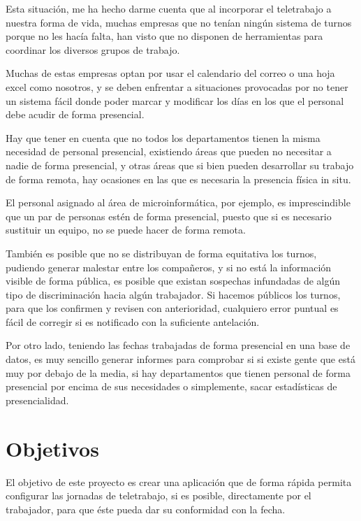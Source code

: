 \documentclass[11pt,spanish,listoffigures,listoftables]{tfgetsinf}
\begin{document}
Esta situación, me ha hecho darme cuenta que al incorporar el teletrabajo a nuestra forma de vida, muchas empresas que no tenían ningún sistema de turnos porque no les hacía falta, han visto que no disponen de herramientas para coordinar los diversos grupos de trabajo.

Muchas de estas empresas optan por usar el calendario del correo o una hoja excel como nosotros, y se deben enfrentar a situaciones provocadas por no tener un sistema fácil donde poder marcar y modificar los días en los que el personal debe acudir de forma presencial.

Hay que tener en cuenta que no todos los departamentos tienen la misma necesidad de personal presencial, existiendo áreas que pueden no necesitar a nadie de forma presencial, 
y otras áreas que si bien pueden desarrollar su trabajo de forma remota, hay ocasiones en las que es necesaria la presencia física in situ. 

El personal asignado al área de microinformática, por ejemplo, es imprescindible que un par de personas estén de forma presencial, puesto que si es necesario sustituir un equipo, no se puede hacer de forma remota.

También es posible que no se distribuyan de forma equitativa los turnos, pudiendo generar malestar entre los compañeros, y si no está la información visible de forma pública, es posible que existan sospechas infundadas de algún tipo de discriminación hacia algún trabajador.
Si hacemos públicos los turnos, para que los confirmen y revisen con anterioridad, cualquiero error puntual es fácil de corregir si es notificado con la suficiente antelación.

Por otro lado, teniendo las fechas trabajadas de forma presencial en una base de datos, es muy sencillo generar informes para comprobar si si existe gente que está muy por debajo de la media, si hay departamentos que tienen personal de forma presencial por encima de sus necesidades o simplemente, sacar estadísticas de presencialidad.

%
%
\section{Objetivos}

El objetivo de este proyecto es crear una aplicación que de forma rápida permita configurar las jornadas de teletrabajo, si es posible, directamente por el trabajador, para que éste pueda dar su conformidad con la fecha.
\end{document}
